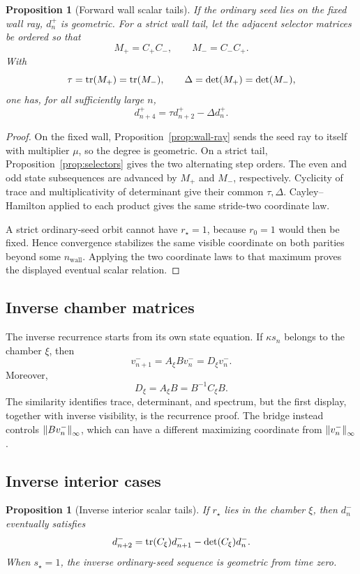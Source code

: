 \documentclass[11pt]{article}
\newtheorem{proposition}[theorem]{Proposition}
\theoremstyle{definition}
\theoremstyle{remark}
\begin{document}
\begin{proposition}[Forward wall scalar tails]
\label{prop:forward-wall-recurrence}
If the ordinary seed lies on the fixed wall ray, \(d_n^+\) is geometric.
For a strict wall tail, let the adjacent selector matrices be ordered so
that
\[
M_+=C_+C_-,\qquad M_-=C_-C_+.
\]
With
\[
\tau=\operatorname{tr}(M_+)=\operatorname{tr}(M_-),\qquad
\Delta=\det(M_+)=\det(M_-),
\]
one has, for all sufficiently large \(n\),
\[
d^+_{n+4}=\tau d^+_{n+2}-\Delta d^+_n.
\]
\end{proposition}

\begin{proof}
On the fixed wall, Proposition~\ref{prop:wall-ray} sends the seed ray to
itself with multiplier \(\mu\), so the degree is geometric.  On a strict
tail, Proposition~\ref{prop:selectors} gives the two alternating step
orders.  The even and odd state subsequences are advanced by \(M_+\) and
\(M_-\), respectively.  Cyclicity of trace and multiplicativity of
determinant give their common \(\tau,\Delta\).  Cayley--Hamilton applied
to each product gives the same stride-two coordinate law.

A strict ordinary-seed orbit cannot have \(r_\star=1\), because
\(r_0=1\) would then be fixed.  Hence convergence stabilizes the same
visible coordinate on both parities beyond some \(n_{\mathrm{wall}}\).
Applying the two coordinate laws to that maximum proves the displayed
eventual scalar relation.
\end{proof}

\subsection{Inverse chamber matrices}

The inverse recurrence starts from its own state equation.  If
\(\kappa s_n\) belongs to the chamber \(\xi\), then
\[
v^-_{n+1}=A_\xi Bv^-_n=D_\xi v^-_n.
\]
Moreover,
\[
D_\xi=A_\xi B=B^{-1}C_\xi B.
\]
The similarity identifies trace, determinant, and spectrum, but the first
display, together with inverse visibility, is the recurrence proof.  The
bridge instead controls \(\left\lVert Bv_n^-\right\rVert_{\infty}\), which can have a different
maximizing coordinate from \(\left\lVert v_n^-\right\rVert_{\infty}\).

\subsection{Inverse interior cases}

\begin{proposition}[Inverse interior scalar tails]
\label{prop:inverse-interior-recurrence}
If \(r_\star\) lies in the chamber \(\xi\), then \(d_n^-\) eventually
satisfies
\[
d^-_{n+2}=\operatorname{tr}(C_\xi)d^-_{n+1}-\det(C_\xi)d^-_n.
\]
When \(s_\star=1\), the inverse ordinary-seed sequence is geometric from
time zero.
\end{proposition}
\end{document}
